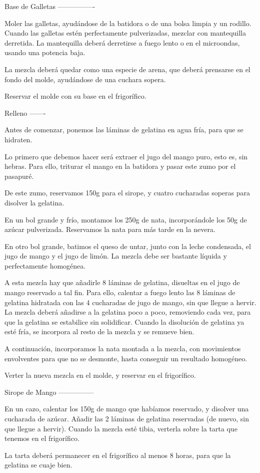 Base de Galletas
----------------

Moler las galletas, ayudándose de la batidora o de una bolsa limpia y un rodillo. Cuando las galletas estén perfectamente pulverizadas, mezclar con mantequilla derretida. La mantequilla deberá derretirse a fuego lento o en el microondas, usando una potencia baja.

La mezcla deberá quedar como una especie de arena, que deberá prensarse en el fondo del molde, ayudándose de una cuchara sopera.

Reservar el molde con su base en el frigorífico.


Relleno
-------

Antes de comenzar, ponemos las láminas de gelatina en agua fría, para que se hidraten.

Lo primero que debemos hacer será extraer el jugo del mango puro, esto es, sin hebras. Para ello, triturar el mango en la batidora y pasar este zumo por el pasapuré.

De este zumo, reservamos 150g para el sirope, y cuatro cucharadas soperas para disolver la gelatina.

En un bol grande y frío, montamos los 250g de nata, incorporándole los 50g de azúcar pulverizada. Reservamos la nata para más tarde en la nevera.

En otro bol grande, batimos el queso de untar, junto con la leche condensada, el jugo de mango y el jugo de limón. La mezcla debe ser bastante líquida y perfectamente homogénea. 

A esta mezcla hay que añadirle 8 láminas de gelatina, disueltas en el jugo de mango reservado a tal fin. Para ello, calentar a fuego lento las 8 láminas de gelatina hidratada con las 4 cucharadas de jugo de mango, sin que llegue a hervir. La mezcla deberá añadirse a la gelatina poco a poco, removiendo cada vez, para que la gelatina se estabilice sin solidificar. Cuando la disolución de gelatina ya esté fría, se incorpora al resto de la mezcla y se remueve bien.

A continuación, incorporamos la nata montada a la mezcla, con movimientos envolventes para que no se desmonte, hasta conseguir un resultado homogéneo.

Verter la nueva mezcla en el molde, y reservar en el frigorífico.


Sirope de Mango
---------------

En un cazo, calentar los 150g de mango que habíamos reservado, y disolver una cucharada de azúcar. Añadir las 2 láminas de gelatina reservadas (de nuevo, sin que llegue a hervir). Cuando la mezcla esté tibia, verterla sobre la tarta que tenemos en el frigorífico.



La tarta deberá permanecer en el frigorífico al menos 8 horas, para que la gelatina se cuaje bien.
